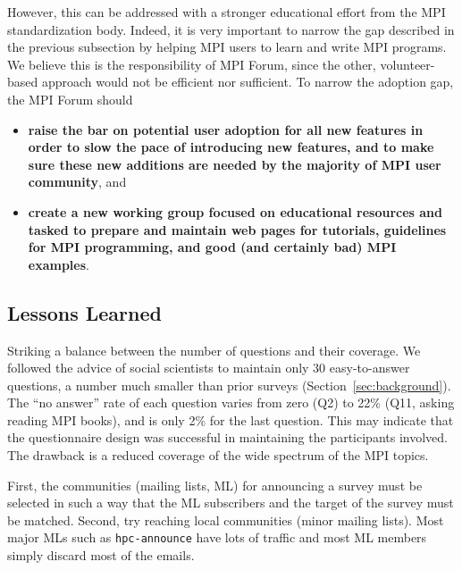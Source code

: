 \documentclass[preprint,5p,times]{elsarticle}
\newcommand{\revision}[2]{{\color{blue}#2}}
\begin{document}
{However, this can be  addressed with a stronger educational effort from the MPI
standardization body. Indeed, it is very important to narrow the gap described in
the previous subsection by helping MPI users to learn and write MPI programs. We
believe this is the responsibility of MPI Forum, since the other,
volunteer-based approach would not be efficient nor sufficient. To narrow the
adoption gap, the MPI Forum should

\begin{itemize}[leftmargin=3ex]
\item {\bf raise the bar on potential user adoption for all new features in
order to slow the pace of introducing new features, and to make sure
these new additions are needed by the majority of MPI user community},
  and
%
\item {\bf create a new working group focused on educational resources and
tasked to prepare and maintain web pages for tutorials, guidelines for MPI
programming, and good (and certainly bad) MPI examples}.
\end{itemize}

\revision{}{
\subsection{Lessons Learned}

\begin{description}[leftmargin=0cm]

\item[Questionnaire Design]
Striking a balance between the number of questions and their coverage.
We followed the advice of social scientists to maintain
only 30 easy-to-answer questions, a number much smaller than prior
surveys (Section~\ref{sec:background}).
%
The ``no answer'' rate of each
question varies from zero (Q2) to 22\% (Q11, asking reading MPI
books), and is only 2\% for the last question.
This may indicate that the questionnaire design was successful in
maintaining the participants involved. The drawback is a reduced
coverage of the wide spectrum of the MPI topics.

\item[Reaching the Target Community]
First, the communities (mailing lists, ML) for announcing a survey
must be selected
in such a way that the ML subscribers and the target of the survey
must be matched. Second, try reaching local communities (minor mailing
lists). Most major MLs such as {\tt hpc-announce} have lots
of traffic and most ML members simply discard most of the emails.


\end{description}}}
\end{document}
